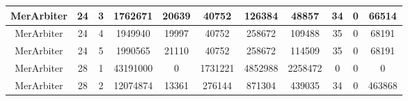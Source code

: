 \begin{table*}[]
\begin{tabular}{@{}ccccccccccc@{}}
        MerArbiter                                               & 24                                                         & 3    & 1762671                                                     & 20639                                                                     & 40752                                                   & 126384                                                     & 48857                                                          & 34                                                        & 0                                                         & 66514   \\ \midrule
        MerArbiter                                               & 24                                                         & 4    & 1949940                                                     & 19997                                                                     & 40752                                                   & 258672                                                     & 109488                                                         & 35                                                        & 0                                                         & 68191   \\ \midrule
        MerArbiter                                               & 24                                                         & 5    & 1990565                                                     & 21110                                                                     & 40752                                                   & 258672                                                     & 114509                                                         & 35                                                        & 0                                                         & 68191   \\ \midrule
        MerArbiter                                               & 28                                                         & 1    & 43191000                                                    & 0                                                                         & 1731221                                                 & 4852988                                                    & 2258472                                                        & 0                                                         & 0                                                         & 0       \\ \midrule
        MerArbiter                                               & 28                                                         & 2    & 12074874                                                    & 13361                                                                     & 276144                                                  & 871304                                                     & 439035                                                         & 34                                                        & 0                                                         & 463868  \\ \bottomrule

\end{tabular}
\end{table*}
